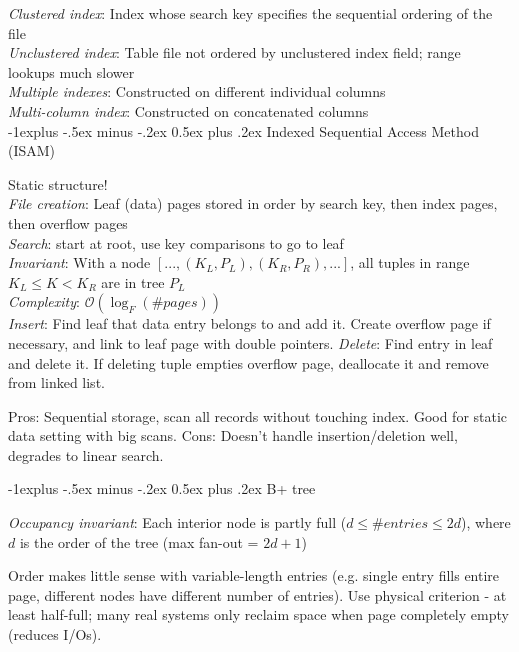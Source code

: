 \documentclass[10pt,landscape]{article}
\makeatletter
\renewcommand{\subsection}{\@startsection{subsection}{2}{0mm}%
                                {-1explus -.5ex minus -.2ex}%
                                {0.5ex plus .2ex}%
                                {\normalfont\normalsize\bfseries}}
\makeatother
\begin{document}
\begin{multicols}{3}
\textit{Clustered index}: Index whose search key specifies the sequential ordering of the file \\
\textit{Unclustered index}: Table file not ordered by unclustered index field; range lookups much slower \\
\textit{Multiple indexes}: Constructed on different individual columns \\
\textit{Multi-column index}: Constructed on concatenated columns \\


\subsection{Indexed Sequential Access Method (ISAM)}

Static structure! \\
\textit{File creation}: Leaf (data) pages stored in order by search key, then index pages, then overflow pages \\
\textit{Search}: start at root, use key comparisons to go to leaf \\
\textit{Invariant}: With a node $[..., (K_L, P_L), (K_R, P_R), ...]$, all tuples in range $K_L \le K < K_R$ are in tree $P_L$ \\
\textit{Complexity}: $\mathcal{O}(\log_F(\# pages))$ \\
\textit{Insert}: Find leaf that data entry belongs to and add it. Create overflow page if necessary, and link to leaf page with double pointers.
\textit{Delete}: Find entry in leaf and delete it. If deleting tuple empties overflow page, deallocate it and remove from linked list.

Pros: Sequential storage, scan all records without touching index. Good for static data setting with big scans. Cons: Doesn't handle insertion/deletion well, degrades to linear search.

\subsection{B+ tree}

\textit{Occupancy invariant}: Each interior node is partly full ($d \le \# entries \le 2d$), where $d$ is the order of the tree (max fan-out = $2d + 1$)

Order makes little sense with variable-length entries (e.g. single entry fills entire page, different nodes have different number of entries). Use physical criterion - at least half-full; many real systems only reclaim space when page completely empty (reduces I/Os).


\end{multicols}
\end{document}
